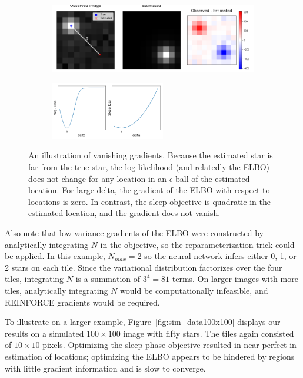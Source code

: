 \begin{figure}[!htb]
    \centering
    \begin{subfigure}[t]{0.8\textwidth}
    \centering
    \includegraphics[width=\textwidth]{figures/gradzero_cartoon.png}
    \end{subfigure}
    \begin{subfigure}[t]{\textwidth}
    \centering
    \includegraphics[width=0.55\textwidth]{figures/gradzero_cartoon2.png}
    \end{subfigure}
    \vspace{-3em}
    \caption{An illustration of vanishing gradients. Because the estimated star is far from the true star, the log-likelihood (and relatedly the ELBO) does not change for any location in an $\epsilon$-ball of the estimated location. 
    For large delta, the gradient of the ELBO with respect to locations is zero. In contrast, the sleep objective is quadratic in the estimated location, and the gradient does not vanish. }
    \label{fig:gradzero_cartoon}
\end{figure}

Also note that low-variance gradients of the ELBO were constructed by analytically integrating $N$ in the objective, so the reparameterization trick could be applied. 
In this example, $N_{max} = 2$ so the neural network infers either 0, 1, or 2 stars on each tile. 
Since the variational distribution factorizes over the four tiles, integrating $N$ is a summation of $3^4 = 81$ terms.
On larger images with more tiles, analytically integrating $N$ would be computationally infeasible, and REINFORCE gradients would be required. 

To illustrate on a larger example, Figure~\ref{fig:sim_data100x100} displays our results on a simulated $100\times 100$ image with fifty stars. The tiles again consisted of $10\times 10$ pixels. Optimizing the sleep phase objective resulted in near perfect in estimation of locations; optimizing the ELBO appears to be hindered by regions with little gradient information and is slow to converge. 

